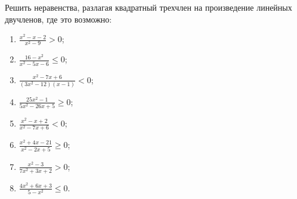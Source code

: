 \documentclass[algebra,a5paper]{pum}
\begin{document}
\begin{exercises}
  \begin{question}
    Решить неравенства, разлагая квадратный трехчлен на произведение линейных двучленов, где это возможно:
    \begin{multicols}{2}
      \begin{enumerate}
        \item $\frac{x^2-x-2}{x^2-9}>0$;
        \item $\frac{16-x^2}{x^2-5x-6}\le0$;
        \item $\frac{x^2-7x+6}{(3x^2-12)(x-1)}<0$;
        \item $\frac{25x^2-1}{5x^2-26x+5}\ge0$;
        \item $\frac{x^2-x+2}{x^2-7x+6}<0$;
        \item $\frac{x^2+4x-21}{x^2-2x+5}\ge0$;
        \item $\frac{x^2-3}{7x^2+3x+2}>0$;
        \item $\frac{4x^2+6x+3}{5-x^2}\le0$.
      \end{enumerate}
    \end{multicols}
  \end{question}
\end{exercises}
\end{document}
